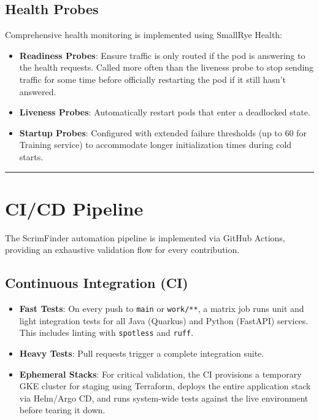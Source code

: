 \documentclass[11pt,a4paper]{article}
\newcommand{\bff}[1]{\textbf{#1}}
\begin{document}
 \subsection{Health Probes}
 
 Comprehensive health monitoring is implemented using SmallRye Health:
 \begin{itemize}
  \item \bff{Readiness Probes}: Ensure traffic is only routed if the pod is answering to the health requests. Called more often than the liveness probe to stop sending traffic for some time before officially restarting the pod if it still hasn't answered.
  \item \bff{Liveness Probes}: Automatically restart pods that enter a deadlocked state.
  \item \bff{Startup Probes}: Configured with extended failure thresholds (up to 60 for Training service) to accommodate longer initialization times during cold starts.
 \end{itemize}

 \vspace{1cm}
 \hrule
 \vspace{1cm}

 \section{CI/CD Pipeline}

 The ScrimFinder automation pipeline is implemented via GitHub Actions, providing an exhaustive validation flow for every contribution.

 \subsection{Continuous Integration (CI)}
 \begin{itemize}
  \item \bff{Fast Tests}: On every push to \texttt{main} or \texttt{work/**}, a matrix job runs unit and light integration tests for all Java (Quarkus) and Python (FastAPI) services. This includes linting with \texttt{spotless} and \texttt{ruff}.
  \item \bff{Heavy Tests}: Pull requests trigger a complete integration suite.
  \item \bff{Ephemeral Stacks}: For critical validation, the CI provisions a temporary GKE cluster for staging using Terraform, deploys the entire application stack via Helm/Argo CD, and runs system-wide tests against the live environment before tearing it down.
 \end{itemize}
\end{document}
